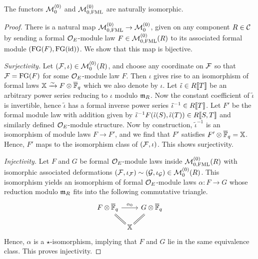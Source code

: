 \documentclass[../main.tex]{subfiles}
\begin{document}
\begin{lem}\label{lem:FunctorsAreIsomorphic}
  The functors $\mathcal{M}^{(0)}_0$ and $\mathcal{M}^{(0)}_{0, \textnormal{FML}}$ are
  naturally isomorphic.
\end{lem}
\begin{proof}
  There is a natural map $\mathcal{M}^{(0)}_{0, \text{FML}} \to \mathcal{M}^{(0)}_0$, given on
  any component
  $R \in \mathcal{C}$ by sending a formal 
  $\mathcal{O}_E$-module law $F \in \mathcal{M}^{(0)}_{0, \text{FML}}(R)$ to its associated formal module
  $(\textnormal{FG}(F), \textnormal{FG}(\operatorname{id}))$. We show that this map is bijective. 

  \textit{Surjectivity.} Let $(\mathcal{F}, \iota) \in \mathcal{M}^{(0)}_0(R)$, and choose any coordinate 
  on $\mathcal{F}$ so that $\mathcal{F} = \textnormal{FG}(F)$ for some $\mathcal{O}_E$-module law $F$. Then
  $\iota$ gives rise to an isomorphism of formal laws $\mathbb{X} \xrightarrow{\sim} F \otimes
  {\overline{\mathbb{F}}_q}$ which we also denote by $\iota$. Let $\tilde \iota \in R\llbracket T
  \rrbracket$ be an arbitrary power series reducing to $\iota$ modulo $\mathfrak{m}_R$. Now
  the constant coefficient of $\tilde \iota$ is invertible, hence $\tilde
  \iota$ has a formal inverse power series $\tilde \iota^{-1} \in R \llbracket T
  \rrbracket$. Let $F'$ be the formal module law with addition given by 
  $\tilde \iota^{-1} F(\tilde \iota(S), \tilde \iota(T)) \in R\llbracket S,T \rrbracket$
  and similarly defined $\mathcal{O}_E$-module structure.
  Now by construction, $\tilde \iota^{-1}$ is an isomorphism of module laws $F \to F'$,
  and we find that $F'$ satisfies $F' \otimes {\overline{\mathbb{F}}_q} = \mathbb{X}$. Hence, $F'$ 
  maps to the isomorphism class of $(\mathcal{F}, \iota)$. This shows surjectivity.

  \textit{Injectivity.} Let $F$ and $G$ be formal $\mathcal{O}_E$-module laws inside
  $\mathcal{M}^{(0)}_{0, \text{FML}}(R)$ with isomorphic associated deformations
  $(\mathcal{F}, \iota_{\mathcal{F}}) \sim (\mathcal{G}, \iota_{\mathcal{G}}) \in \mathcal{M}^{(0)}_0(R)$. 
  This isomorphism yields an isomorphism of formal $\mathcal{O}_E$-module laws
  $\alpha\colon F \to G$ whose reduction modulo $\mathfrak{m}_R$ fits into the following
  commutative triangle.
  \begin{equation*}
\begin{tikzcd}[ampersand replacement=\&]
	{F\otimes\Fqbar} \& {G\otimes\Fqbar} \\
	{} \& {}
	\arrow["{\alpha_0}", from=1-1, to=1-2]
  \arrow[""{name=0, anchor=center, inner sep=0}, "{\text{$\XX$}}"{marking, allow upside down}, draw=none, from=2-1, to=2-2]
	\arrow[shorten >=7pt, Rightarrow, no head, from=1-1, to=0]
	\arrow[shorten >=7pt, Rightarrow, no head, from=1-2, to=0]
\end{tikzcd}
  \end{equation*}
  Hence, $\alpha$ is a $\star$-isomorphism, implying that 
  $F$ and $G$ lie in the same equivalence class. This proves injectivity.
\end{proof}
\end{document}
